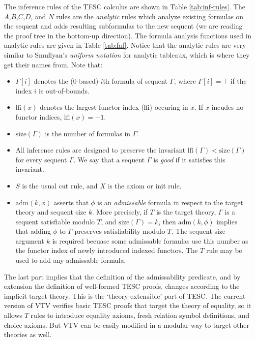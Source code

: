 \documentclass[12pt]{article}
\newcommand{\lfi}[0]{\mathrm{lfi}}
\newcommand{\size}[0]{\mathrm{size}}
\newcommand{\adm}[0]{\mathrm{adm}}
\begin{document}
The inference rules of the TESC calculus are shown in Table \ref{tab:inf-rules}.
The $A$,$B$,$C$,$D$, and $N$ rules are the \textit{analytic} rules which analyze  
existing formulas on the sequent and adds resulting subformulas to the new 
sequent (we are reading the proof tree in the bottom-up direction).
The formula analysis functions used in analytic rules are given in Table 
\ref{tab:faf}. Notice that the analytic rules are very similar to 
Smullyan's \textit{uniform notation} for analytic tableaux, which is where 
they get their names from. Note that: 
\begin{itemize}
  \item $\Gamma[i]$ denotes the (0-based) $i$th formula of sequent $\Gamma$, 
    where $\Gamma[i] = \top$ if the index $i$ is out-of-bounds. 
  \item $\lfi(x)$ denotes the largest functor index (lfi) occuring in $x$. 
    If $x$ incudes no functor indices, $\lfi(x) = -1$.
  \item $\size(\Gamma)$ is the number of formulas in $\Gamma$.
  \item All inference rules are designed to preserve the invariant
    $\lfi(\Gamma) < \size(\Gamma)$ for every sequent $\Gamma$. We say that 
    a sequent $\Gamma$ is \textit{good} if it satisfies this invariant.
  \item $S$ is the usual cut rule, and $X$ is the axiom or init rule. 
  \item $\adm(k,\phi)$ asserts that $\phi$ is an \textit{admissable} formula in 
    respect to the target theory and sequent size $k$. More precisely, if $T$ 
    is the target theory, $\Gamma$ is a sequent satisfiable modulo $T$, and 
    $\size(\Gamma) = k$, then $\adm(k,\phi)$ implies that adding $\phi$ to 
    $\Gamma$ preserves satisfiability modulo $T$. The sequent size argument $k$ 
    is required becuase some admissable formulas use this number as the functor 
    index of newly introduced indexed functors. The $T$ rule may be used to add 
    any admissable formula.
\end{itemize}
The last part implies that the definition of the admissability predicate, and by 
extension the definition of well-formed TESC proofs, changes according to the implicit 
target theory. This is the `theory-extensible' part of TESC. The current version of 
VTV verifies basic TESC proofs that target the theory of equality, so it allows $T$ 
rules to introduce equality axioms, fresh relation symbol definitions, and choice axioms.
But VTV can be easily modified in a modular way to target other theories as well.
\end{document}
